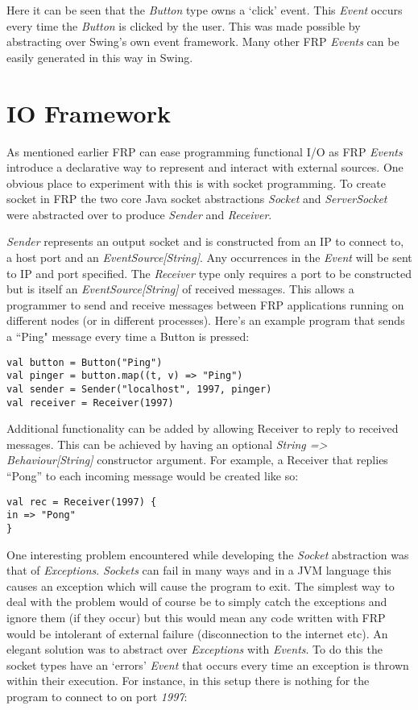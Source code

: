     Here it can be seen that the \emph{Button} type owns a `click' event. This \emph{Event} occurs every time the 
    \emph{Button} is clicked by the user. This was made possible by abstracting over Swing's own event framework. Many other 
    FRP \emph{Events} can be easily generated in this way in Swing.
  
  \section{IO Framework}
  
  As mentioned earlier FRP can ease programming functional I/O as FRP \emph{Events} introduce a declarative way to represent 
  and interact with external sources. One obvious place to experiment with this is with socket programming. To create socket 
  in FRP the two core Java socket abstractions \emph{Socket} and \emph{ServerSocket} were abstracted over to produce
  \emph{Sender} and \emph{Receiver}. 

  \emph{Sender} represents an output socket and is constructed from an IP to connect to, a host port and an 
  \emph{EventSource[String]}. Any occurrences in the \emph{Event} will be sent to IP and port specified. The \emph{Receiver} 
  type only requires a port to be constructed but is itself an \emph{EventSource[String]} of received messages. This allows 
  a programmer to send and receive messages between FRP applications running on different nodes (or in different processes).
  Here's an example program that sends a ``Ping" message every time a Button is pressed:

\begin{verbatim}
val button = Button("Ping")
val pinger = button.map((t, v) => "Ping")
val sender = Sender("localhost", 1997, pinger)
val receiver = Receiver(1997)
\end{verbatim}
  
  Additional functionality can be added by allowing Receiver to reply to received messages. This can be achieved by
  having an optional \emph{String => Behaviour[String]} constructor argument. For example, a Receiver that replies
  ``Pong'' to each incoming message would be created like so:

\begin{verbatim}
val rec = Receiver(1997) {
in => "Pong"
}
\end{verbatim}    

  One interesting problem encountered while developing the \emph{Socket} abstraction was that of \emph{Exceptions}. 
  \emph{Sockets} can fail in many ways and in a JVM language this causes an exception which will cause the program to exit. 
  The simplest way to deal with the problem would of course be to simply catch the exceptions and ignore them (if they 
  occur) but this would mean any code written with FRP would be intolerant of external failure (disconnection to the 
  internet etc). An elegant solution was to abstract over \emph{Exceptions} with \emph{Events}. To do this the socket types 
  have an `errors' \emph{Event} that occurs every time an exception is thrown within their execution. For instance, in this 
  setup there is nothing for the program to connect to on port \emph{1997}:

